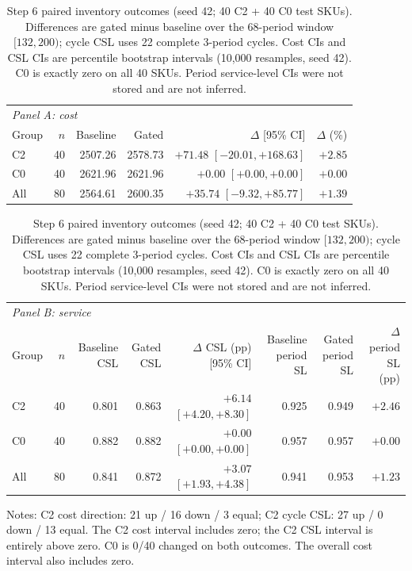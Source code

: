 \begin{table}[t]
\centering
\caption{Step 6 paired inventory outcomes (seed 42; 40 C2 + 40 C0 test SKUs). Differences are gated minus baseline over the 68-period window $[132,200)$; cycle CSL uses 22 complete 3-period cycles. Cost CIs and CSL CIs are percentile bootstrap intervals (10,000 resamples, seed 42). C0 is exactly zero on all 40 SKUs. Period service-level CIs were not stored and are not inferred.}
\label{tab:step6-outcomes}
\small
\begin{tabular}{lrrrrr}
\toprule
\multicolumn{6}{l}{\textit{Panel A: cost}} \\
Group & $n$ & Baseline & Gated & $\Delta$ [95\% CI] & $\Delta$ (\%) \\
\midrule
C2 & 40 & 2507.26 & 2578.73 & $+71.48$ $[-20.01, +168.63]$ & $+2.85$ \\
C0 & 40 & 2621.96 & 2621.96 & $+0.00$ $[+0.00, +0.00]$ & $+0.00$ \\
All & 80 & 2564.61 & 2600.35 & $+35.74$ $[-9.32, +85.77]$ & $+1.39$ \\
\bottomrule
\end{tabular}
\par\smallskip
\begin{tabular}{lrrrrrrr}
\toprule
\multicolumn{8}{l}{\textit{Panel B: service}} \\
Group & $n$ & Baseline CSL & Gated CSL & $\Delta$ CSL (pp) [95\% CI] & Baseline period SL & Gated period SL & $\Delta$ period SL (pp) \\
\midrule
C2 & 40 & 0.801 & 0.863 & $+6.14$ $[+4.20, +8.30]$ & 0.925 & 0.949 & $+2.46$ \\
C0 & 40 & 0.882 & 0.882 & $+0.00$ $[+0.00, +0.00]$ & 0.957 & 0.957 & $+0.00$ \\
All & 80 & 0.841 & 0.872 & $+3.07$ $[+1.93, +4.38]$ & 0.941 & 0.953 & $+1.23$ \\
\bottomrule
\end{tabular}
\par\smallskip
\footnotesize
Notes: C2 cost direction: 21 up / 16 down / 3 equal; C2 cycle CSL: 27 up / 0 down / 13 equal. The C2 cost interval includes zero; the C2 CSL interval is entirely above zero. C0 is 0/40 changed on both outcomes. The overall cost interval also includes zero.
\end{table}
